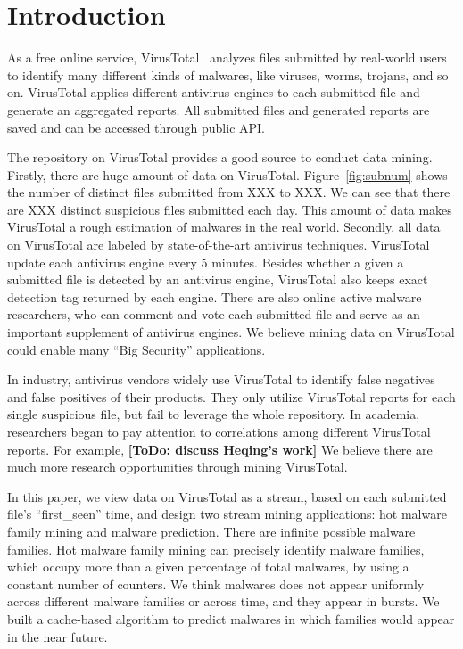 \section{Introduction}

As a free online service, VirusTotal~\cite{virustotal} analyzes files submitted by real-world users to identify many different kinds of malwares, 
like viruses, worms, trojans, and so on. 
VirusTotal applies different antivirus engines to each submitted file and generate an aggregated reports. 
All submitted files and generated reports are saved and can be accessed through public API. 


The repository on VirusTotal provides a good source to conduct data mining. 
Firstly, there are huge amount of data on VirusTotal.
Figure~\ref{fig:subnum} shows the number of distinct files submitted from XXX to XXX. 
We can see that there are XXX distinct suspicious files submitted each day. 
This amount of data makes VirusTotal a rough estimation of malwares in the real world. 
Secondly, all data on VirusTotal are labeled by state-of-the-art antivirus techniques. 
VirusTotal update each antivirus engine every 5 minutes. 
Besides whether a given a submitted file is detected by an antivirus engine, VirusTotal also keeps exact detection tag returned by each engine. 
There are also online active malware researchers, 
who can comment and vote each submitted file and serve as an important supplement of antivirus engines. 
We believe mining data on VirusTotal could enable many ``Big Security'' applications. 

In industry, antivirus vendors widely use VirusTotal to identify false negatives and false positives of their products. 
They only utilize VirusTotal reports for each single suspicious file, but fail to leverage the whole repository. 
In academia, researchers began to pay attention to correlations among different VirusTotal reports. 
For example, {\bf [ToDo: discuss Heqing's work]}
We believe there are much more research opportunities through mining VirusTotal. 

In this paper, we view data on VirusTotal as a stream, based on each submitted file’s ``first\_seen'' time, and design two stream mining applications: 
hot malware family mining and malware prediction. 
There are infinite possible malware families. 
Hot malware family mining can precisely identify malware families, 
which occupy more than a given percentage of total malwares, by using a constant number of counters.
We think malwares does not appear uniformly across different malware families or across time, 
and they appear in bursts. We built a cache-based algorithm to predict malwares in which families would appear in the near future. 

